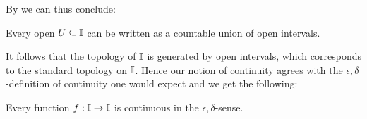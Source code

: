 By  we can thus conclude:
\begin{lemma}\label{IntervalTopologyStandard}
  Every open $U\subseteq \mathbb{I}$ can be written as a countable union of open intervals.
\end{lemma} 
%
  It follows that the topology of $\mathbb{I}$ is generated by open intervals, 
  which corresponds to the standard topology on $\mathbb{I}$. 
  Hence our notion of continuity agrees with the 
  $\epsilon,\delta$-definition of continuity one would expect and we get the following:
\begin{theorem}
  Every function $f:\mathbb{I}\to \mathbb{I}$ is continuous in the $\epsilon,\delta$-sense. 
\end{theorem}
